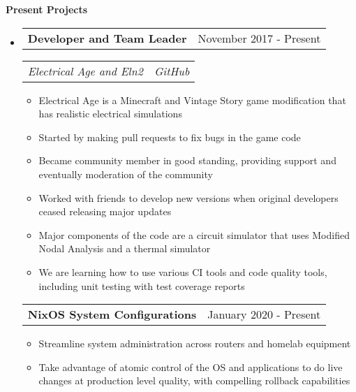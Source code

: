\documentclass[letterpaper,12pt]{article}
\makeatletter
\newcommand{\resitem}[1]{\item #1 \vspace{-3pt}}
\newcommand{\resheading}[1]{{\large {\textbf{#1 \vphantom{p\^{E}}}}}\vspace{-3pt}}
\newcommand{\topheading}[2]{
\begin{tabular*}{6.5in}{l@{\extracolsep{\fill}}r}
		\textbf{#1} & #2 \\
\end{tabular*}}
\newcommand{\bottomheading}[2]{
\begin{tabular*}{6.5in}{l@{\extracolsep{\fill}}r}
		\textit{#1} & \textit{#2} \\
\end{tabular*}\vspace{-6pt}}
\newcommand{\singleheading}[2]{
\vspace{6pt}
\begin{tabular*}{6.5in}{l@{\extracolsep{\fill}}r}
		\textbf{#1} & #2 \\
\end{tabular*}
\vspace{-3pt}
}
\makeatother
\begin{document}
\resheading{Present Projects}
\begin{itemize}
	\item[]

	\topheading{Developer and Team Leader}{November 2017 - Present}
	\bottomheading{Electrical Age and Eln2}{GitHub}
	\begin{itemize}
		\resitem{Electrical Age is a Minecraft and Vintage Story game modification that has realistic electrical simulations}
		\resitem{Started by making pull requests to fix bugs in the game code}
		\resitem{Became community member in good standing, providing support and eventually moderation of the community}
		\resitem{Worked with friends to develop new versions when original developers ceased releasing major updates}
		\resitem{Major components of the code are a circuit simulator that uses Modified Nodal Analysis and a thermal simulator}
		\resitem{We are learning how to use various CI tools and code quality tools, including unit testing with test coverage reports}
	\end{itemize}

	\singleheading{NixOS System Configurations}{January 2020 - Present}
	\begin{itemize}
		\resitem{Streamline system administration across routers and homelab equipment}
		\resitem{Take advantage of atomic control of the OS and applications to do live changes at production level quality, with compelling rollback capabilities}
	\end{itemize}

\end{itemize}


\newpage
\end{document}
